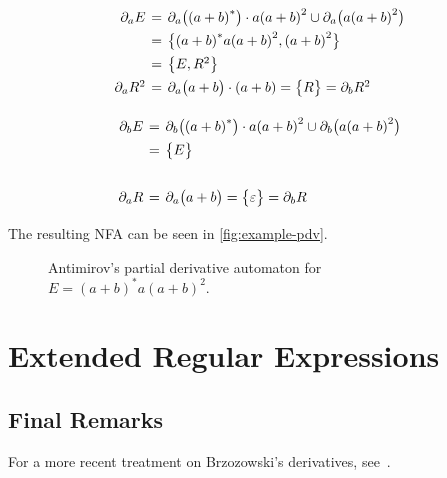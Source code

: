 \documentclass{article}
\theoremstyle{definition}
\newcommand{\emptystr}{\varepsilon}
\newcommand{\pdv}[2]{\partial_{#1} \bigl(#2\bigr)}
\begin{document}
\begin{minipage}{.5\textwidth}
\[
\arraycolsep=2pt\def\arraystretch{1.4}
  \begin{array}{rcl}
  \partial_a E &=& \pdv{a}{{(a+b)}^*}\cdot a{(a+b)}^2 \cup
    \pdv{a}{a{(a+b)}^2} \\
    &=& \bigl\{{(a+b)}^*a{(a+b)}^2, {(a+b)}^2\bigr\} \\
                                   &=& \bigl\{E, R^2\bigr\} \\
    \partial_a R^2 &=& \pdv{a}{a+b}\cdot {(a+b)} = \bigl\{R \bigr\} = \partial_b R^2 \\
  \end{array}
\]
\end{minipage}%
\begin{minipage}{.5\textwidth}
\[
\arraycolsep=2pt\def\arraystretch{1.4}
  \begin{array}{rcl}
    \partial_b E &=& \pdv{b}{{(a+b)}^*}\cdot a{(a+b)}^2 \cup \pdv{b}{a{(a+b)}^2} \\
                                  &=& \bigl\{E \bigr\} \\
    \\
    \partial_a R &=& \pdv{a}{a+b} = \bigl\{\emptystr \bigr\} = \partial_b R \\
  \end{array}
\]
\end{minipage}
\vspace{14pt}

The resulting NFA can be seen in \autoref{fig:example-pdv}.

\begin{figure}[ht] %
\centering %
  \caption{Antimirov's partial derivative automaton for $E = {(a+b)}^*a{(a+b)}^2$.}\label{fig:example-pdv}
\end{figure}

\section{Extended Regular Expressions}

\subsection{Final Remarks}
For a more recent treatment on Brzozowski's derivatives, see~\cite{ORT09}.

\newpage 


\end{document}
